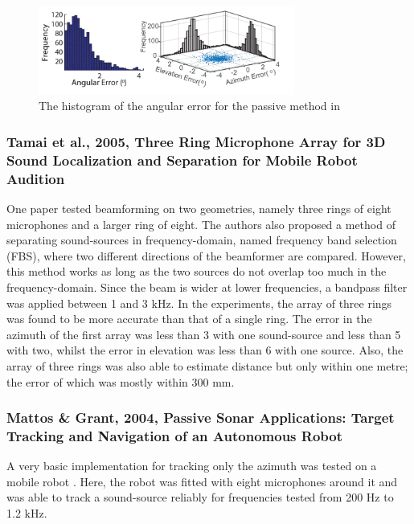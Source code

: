 \documentclass{report}
\begin{document}
\begin{figure}[H]
\includegraphics[width=0.75\textwidth]{./basiri_2016/histogram.png}
\centering
\caption{The histogram of the angular error for the passive method in \cite{basiri_-board_2016}}
\label{fig:basiri_2016_histogram}
\centering
\end{figure}

\subsubsection{Tamai et al., 2005, Three Ring Microphone Array for 3D Sound Localization and Separation for Mobile Robot Audition}

One paper \cite{tamai_three_2005} tested beamforming on two geometries, namely three rings of eight microphones and a larger ring of eight. The authors also proposed a method of separating sound-sources in frequency-domain, named frequency band selection (FBS), where two different directions of the beamformer are compared. However, this method works as long as the two sources do not overlap too much in the frequency-domain. Since the beam is wider at lower frequencies, a bandpass filter was applied between 1 and 3 \si{kHz}. In the experiments, the array of three rings was found to be more accurate than that of a single ring. The error in the azimuth of the first array was less than 3 \si{\deg} with one sound-source and less than 5 \si{\deg} with two, whilst the error in elevation was less than 6 \si{\deg} with one source. Also, the array of three rings was also able to estimate distance but only within one metre; the error of which was mostly within 300 \si{mm}.

\subsubsection{Mattos \& Grant, 2004, Passive Sonar Applications: Target Tracking and Navigation of an Autonomous Robot}

A very basic implementation for tracking only the azimuth was tested on a mobile robot \cite{mattos_passive_2004}. Here, the robot was fitted with eight microphones around it and was able to track a sound-source reliably for frequencies tested from 200 \si{Hz} to 1.2 \si{kHz}.
\end{document}
